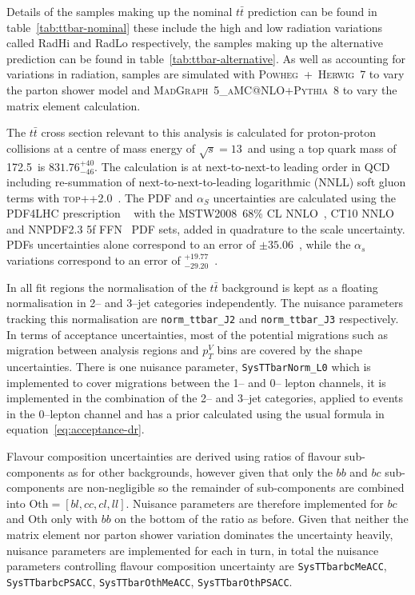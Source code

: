 Details of the samples making up the nominal $t\bar{t}$ prediction can be found
in table~\ref{tab:ttbar-nominal} these include the high and low radiation
variations called  RadHi and RadLo respectively, the samples making up the
alternative prediction can be found in table~\ref{tab:ttbar-alternative}. As
well as accounting for variations in radiation, samples are simulated with
\textsc{Powheg}~+~\textsc{Herwig}~7 to vary the parton shower model and
\textsc{MadGraph}~5\textsc{\_aMC@NLO}+\textsc{Pythia}~8 to vary the matrix
element calculation. 


The $t\bar{t}$ cross section relevant to this analysis is calculated for
proton-proton collisions at a centre of mass energy of $\sqrt{s} = 13$~\TeV and
using a top quark mass of 172.5~\GeV is $831.76^{+40}_{-46}$\picobarn. The
calculation is  at next-to-next-to leading order in QCD including re-summation
of next-to-next-to-leading logarithmic (NNLL) soft gluon terms with
\textsc{top++2.0}~\cite{Beneke2012695,Cacciari2012612,PhysRevLett.109.132001,NNLOcorr,NNLOcorrNLO,PhysRevLett.110.252004,Czakon:2011xx}.
The PDF and $\alpha_S$ uncertainties are calculated using the PDF4LHC
prescription ~\cite{Botje:2011sn} with the MSTW2008~68\% CL
NNLO~\cite{PDFLHC,alphasunc}, CT10
NNLO~\cite{PhysRevD.82.074024,PhysRevD.89.033009} and NNPDF2.3 5f
FFN~\cite{Ball:2012cx} PDF sets, added in quadrature to the scale uncertainty.
PDFs uncertainties alone correspond to an error of $\pm 35.06$~\picobarn, while
the $\alpha_s$ variations correspond to an error of
$^{+19.77}_{-29.20}$~\picobarn.

In all fit regions the normalisation of the $t\bar{t}$ background is kept as a
floating normalisation in 2-- and 3--jet categories independently. The nuisance
parameters tracking this normalisation are \texttt{norm\_ttbar\_J2} and
\texttt{norm\_ttbar\_J3} respectively. In terms of acceptance uncertainties,
most of the potential migrations such as migration between analysis regions and
$p_T^V$ bins are covered by the shape uncertainties. There is one nuisance
parameter, \texttt{SysTTbarNorm\_L0} which is implemented to cover migrations
between the 1-- and 0-- lepton channels, it is implemented in the combination of
the 2-- and 3--jet categories, applied to events in the 0--lepton channel and
has a prior calculated using the usual formula in
equation~\ref{eq:acceptance-dr}.

Flavour composition uncertainties are derived using ratios of flavour
sub-components as for other backgrounds, however given that only the $bb$ and
$bc$ sub-components are non-negligible so the remainder of sub-components are
combined into $\text{Oth} = [bl, cc, cl, ll]$. Nuisance parameters are therefore
implemented for $bc$ and Oth only with $bb$ on the bottom of the ratio as
before. Given that neither the matrix element nor parton shower variation
dominates the uncertainty heavily, nuisance parameters are implemented for each
in turn, in total the nuisance parameters controlling flavour composition
uncertainty are \texttt{SysTTbarbcMeACC}, \texttt{SysTTbarbcPSACC},
\texttt{SysTTbarOthMeACC}, \texttt{SysTTbarOthPSACC}.


